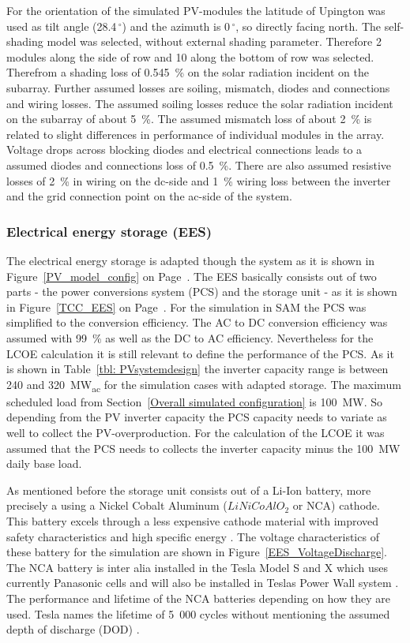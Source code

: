 For the orientation of the simulated PV-modules the latitude of Upington was used as tilt angle (28.4$\,^{\circ}$) and the azimuth is 0$\,^{\circ}$, so directly facing north. The self-shading model was selected, without external shading parameter. Therefore 2 modules along the side of row and 10 along the bottom of row was selected. Therefrom a shading loss of 0.545~\% on the solar radiation incident on the subarray. Further assumed losses are soiling, mismatch, diodes and connections and wiring losses. The assumed soiling losses reduce the solar radiation incident on the subarray of about 5~\%. The assumed mismatch loss of about 2~\% is related to slight differences in performance of individual modules in the array. Voltage drops across blocking diodes and electrical connections leads to a assumed diodes and connections loss of 0.5~\%. There are also assumed resistive losses of 2~\% in wiring on the dc-side and 1~\% wiring loss between the inverter and the grid connection point on the ac-side of the system.

\subsubsection{Electrical energy storage (EES)}
The electrical energy storage is adapted though the system as it is shown in Figure~\ref{PV_model_config} on Page~\pageref{PV_model_config}. The EES basically consists out of two parts - the power conversions system (PCS) and the storage unit - as it is shown in Figure~\ref{TCC_EES} on Page~\pageref{TCC_EES}. For the simulation in SAM the PCS was simplified to the conversion efficiency. The AC to DC conversion efficiency was assumed with 99~\% as well as the DC to AC efficiency. Nevertheless for the LCOE calculation it is still relevant to define the performance of the PCS. As it is shown in Table~\ref{tbl: PVsystemdesign} the inverter capacity range is between 240 and 320~MW\textsubscript{ac} for the simulation cases with adapted storage. The maximum scheduled load from Section~\ref{Overall simulated configuration} is 100~MW. So depending from the PV inverter capacity the PCS capacity needs to variate as well to collect the  PV-overproduction. For the calculation of the LCOE it was assumed that the PCS needs to collects the inverter capacity minus the 100~MW daily base load.



As mentioned before the storage unit consists out of a Li-Ion battery, more precisely a using a Nickel Cobalt Aluminum ($LiNiCoAlO_2$  or NCA) cathode. This battery excels through a less expensive cathode material with improved safety characteristics and high specific energy \cite{NREL2015a}. The voltage characteristics of these battery for the simulation are shown in Figure~\ref{EES_VoltageDischarge}. The NCA battery is inter alia installed in the Tesla Model S and X \cite{Nykvist2015} which uses currently Panasonic cells and will also be installed in Teslas Power Wall system \cite{Shahan2015}. The performance and lifetime of the NCA batteries depending on how they are used. Tesla names the lifetime of 5~000 cycles without mentioning the assumed depth of discharge (DOD) \cite{Shahan2015}.

